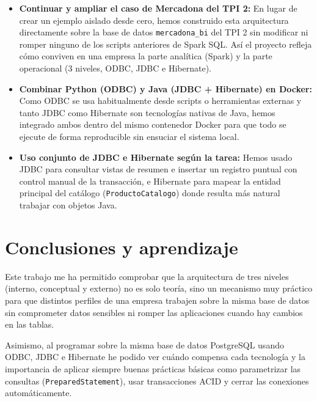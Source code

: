 \documentclass[a4paper,12pt]{article}
\begin{document}
\begin{itemize}[leftmargin=1.0cm]
  \item \textbf{Continuar y ampliar el caso de Mercadona del TPI 2:} En lugar de crear un ejemplo aislado desde cero, hemos construido esta arquitectura directamente sobre la base de datos \texttt{mercadona\_bi} del TPI 2 sin modificar ni romper ninguno de los scripts anteriores de Spark SQL. Así el proyecto refleja cómo conviven en una empresa la parte analítica (Spark) y la parte operacional (3 niveles, ODBC, JDBC e Hibernate).
  \item \textbf{Combinar Python (ODBC) y Java (JDBC + Hibernate) en Docker:} Como ODBC se usa habitualmente desde scripts o herramientas externas y tanto JDBC como Hibernate son tecnologías nativas de Java, hemos integrado ambos dentro del mismo contenedor Docker para que todo se ejecute de forma reproducible sin ensuciar el sistema local.
  \item \textbf{Uso conjunto de JDBC e Hibernate según la tarea:} Hemos usado JDBC para consultar vistas de resumen e insertar un registro puntual con control manual de la transacción, e Hibernate para mapear la entidad principal del catálogo (\texttt{ProductoCatalogo}) donde resulta más natural trabajar con objetos Java.
\end{itemize}

\section{Conclusiones y aprendizaje}

Este trabajo me ha permitido comprobar que la arquitectura de tres niveles (interno, conceptual y externo) no es solo teoría, sino un mecanismo muy práctico para que distintos perfiles de una empresa trabajen sobre la misma base de datos sin comprometer datos sensibles ni romper las aplicaciones cuando hay cambios en las tablas.

Asimismo, al programar sobre la misma base de datos PostgreSQL usando ODBC, JDBC e Hibernate he podido ver cuándo compensa cada tecnología y la importancia de aplicar siempre buenas prácticas básicas como parametrizar las consultas (\texttt{PreparedStatement}), usar transacciones ACID y cerrar las conexiones automáticamente.

\end{document}
